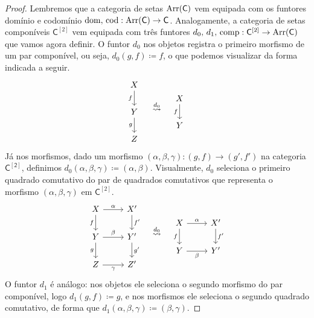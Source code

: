 \begin{proof}
  Lembremos que a categoria de setas $\mathrm{Arr}(\mathsf{C})$ vem equipada com os funtores domínio e codomínio $\mathrm{dom},\, \mathrm{cod}: \mathrm{Arr}(\mathsf{C}) \to \mathsf{C}$.
  Analogamente, a categoria de setas componíveis $\mathsf{C}^{[2]}$ vem equipada com três funtores $d_{0},\, d_{1},\, \mathrm{comp}: \mathsf{C}^{[2]} \to \mathrm{Arr}(\mathsf{C})$ que vamos agora definir.
  O funtor $d_{0}$ nos objetos registra o primeiro morfismo de um par componível, ou seja, $d_{0}(g,f) \coloneqq f$, o que podemos visualizar da forma indicada a seguir.
  \begin{displaymath}
    \begin{tikzcd}
      X
      \arrow[d, "f" swap]
      \\ Y
      \arrow[d, "g" swap]
      \\ Z
    \end{tikzcd}
    \quad
    \overset{d_{0}}{\rightsquigarrow}
    \quad
    \begin{tikzcd}
      X
      \arrow[d, "f" swap]
      \\ Y
    \end{tikzcd}
  \end{displaymath}
  Já nos morfismos, dado um morfismo $(\alpha,\beta,\gamma): (g,f) \to (g',f')$ na categoria $\mathsf{C^{[2]}}$, definimos $d_{0}(\alpha,\beta,\gamma) \coloneqq (\alpha,\beta)$.
  Visualmente, $d_{0}$ seleciona o primeiro quadrado comutativo do par de quadrados comutativos que representa o morfismo $(\alpha,\beta,\gamma)$ em $\mathsf{C}^{[2]}$.
  \begin{displaymath}
    \begin{tikzcd}
      X
      \arrow[d, "f" swap]
      \arrow[r, "\alpha"]
      & X'
      \arrow[d, "f'"]
      \\ Y
      \arrow[d, "g" swap]
      \arrow[r, "\beta"]
      & Y'
      \arrow[d, "g'"]
      \\ Z
      \arrow[r, "\gamma" swap]
      & Z'
    \end{tikzcd}
    \quad \overset{d_{0}}{\rightsquigarrow} \quad
    \begin{tikzcd}
      X
      \arrow[d, "f" swap]
      \arrow[r, "\alpha"]
      & X'
      \arrow[d, "f'"]
      \\ Y
      \arrow[r, "\beta" swap]
      & Y'
    \end{tikzcd}
  \end{displaymath}
  O funtor $d_{1}$ é análogo: nos objetos ele seleciona o segundo morfismo do par componível, logo $d_{1}(g,f) \coloneqq g$, e nos morfismos ele seleciona o segundo quadrado comutativo, de forma que $d_{1}(\alpha,\beta,\gamma) \coloneqq (\beta,\gamma)$.

\end{proof}
